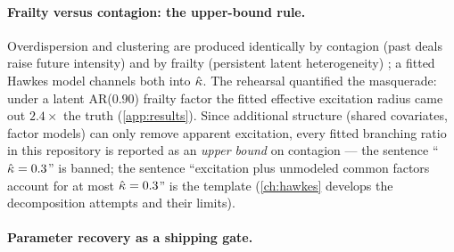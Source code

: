 \paragraph{Frailty versus contagion: the upper-bound rule.}
Overdispersion and clustering are produced identically by contagion
(past deals raise future intensity) and by frailty (persistent latent
heterogeneity) \citep{duffie2009,azizpour2018}; a fitted Hawkes model
channels both into $\hat{\kappa}$. The rehearsal quantified the
masquerade: under a latent AR($0.90$) frailty factor the fitted effective
excitation radius came out $2.4\times$ the truth (\cref{app:results}).
Since additional structure (shared covariates, factor models) can only
remove apparent excitation, every fitted branching ratio in this
repository is reported as an \emph{upper bound} on contagion --- the
sentence ``$\hat{\kappa}=0.3$'' is banned; the sentence ``excitation plus
unmodeled common factors account for at most $\hat{\kappa}=0.3$'' is the
template (\cref{ch:hawkes} develops the decomposition attempts and their
limits).

\paragraph{Parameter recovery as a shipping gate.}

